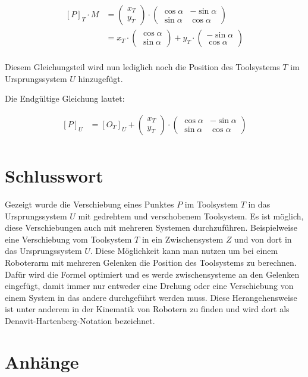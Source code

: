 \documentclass{article}
\newcommand{\m}[1]{\begin{pmatrix}#1\end{pmatrix}}
\begin{document}
    \[
        \begin{split}
            {[P]}_{T} \cdot M &= \m{x_T \\ y_T} \cdot \m{\cos \alpha & - \sin \alpha \\ \sin \alpha & \cos \alpha} \\
            &= x_T \cdot \m{\cos \alpha \\ \sin \alpha} + y_T \cdot \m{- \sin \alpha \\ \cos \alpha} \\
        \end{split}
    \]

    Diesem Gleichungsteil wird nun lediglich noch die Position des Toolsystems $T$ im Ursprungssystem $U$ hinzugefügt.

    Die Endgültige Gleichung lautet:

    \[
        \begin{split}
            {[P]}_U &= {[O_T]}_U + \m{x_T \\ y_T} \cdot \m{\cos \alpha & - \sin \alpha \\ \sin \alpha & \cos \alpha} \\
        \end{split}
    \]

    \newpage{}

    \section{Schlusswort}

    Gezeigt wurde die Verschiebung eines Punktes $P$ im Toolsystem $T$ in das Ursprungssystem $U$
    mit gedrehtem und verschobenem Toolsystem.
    Es ist möglich, diese Verschiebungen auch mit mehreren Systemen durchzuführen. Beispielweise
    eine Verschiebung vom Toolsystem $T$ in ein Zwischensystem $Z$ und von dort in das Ursprungssystem $U$.
    Diese Möglichkeit kann man nutzen um bei einem Roboterarm mit mehreren Gelenken die Position
    des Toolsystems zu berechnen. Dafür wird die Formel optimiert und es werde zwischensysteme an den Gelenken
    eingefügt, damit immer nur entweder eine Drehung oder eine Verschiebung von einem System in das andere
    durchgeführt werden muss. Diese Herangehensweise ist unter anderem in der Kinematik von Robotern
    zu finden und wird dort als Denavit-Hartenberg-Notation bezeichnet.
    


    \newpage

    \section{Anhänge}
\end{document}
